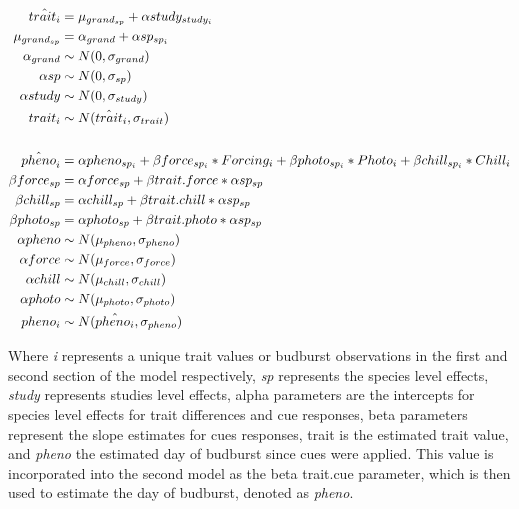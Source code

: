 \documentclass{article}\usepackage[]{graphicx}\usepackage[]{color}
\begin{document}
\begin{align*}
\hat{trait_i} &= \mu_{grand_{sp}} + \alpha study_{study_i} \\
\mu_{grand_{sp}} &= \alpha_{grand} + \alpha sp_{sp_i} \\
\alpha_{grand}  & \sim N(0, \sigma_{grand})\\
\alpha sp & \sim N(0, \sigma_{sp}) \\
\alpha study& \sim N(0, \sigma_{study}) \\
trait_i & \sim N(\hat{trait}_i, \sigma_{trait}) \\
\vspace{1ex}\\
\hat{pheno}_i  &= \alpha pheno_{sp_i} + \beta force_{sp_i} * Forcing_{i} + \beta photo_{sp_i}  * Photo_{i} + \beta chill_{sp_i} * Chill_{i} \\
\beta force_{sp} &= \alpha force_{sp} + \beta trait.force * \alpha sp_{sp}\\
\beta chill_{sp} &= \alpha chill_{sp} + \beta trait.chill * \alpha sp_{sp}\\
\beta photo_{sp} &= \alpha photo_{sp} + \beta trait.photo * \alpha sp_{sp}\\
\alpha pheno & \sim N(\mu_{pheno}, \sigma_{pheno}) \\
\alpha force& \sim N(\mu_{force}, \sigma_{force}) \\
\alpha chill & \sim N(\mu_{chill}, \sigma_{chill}) \\
\alpha photo & \sim N(\mu_{photo}, \sigma_{photo}) \\
pheno_{i} & \sim N(\hat{pheno_i}, \sigma_{pheno}) \\
\end{align*}

Where \emph{i} represents a unique trait values or budburst observations in the first and second section of the model respectively, \emph{sp} represents the species level effects, \emph{study} represents studies level effects, %
alpha parameters are the intercepts for species level effects for trait differences and cue responses, %
 beta parameters represent the slope estimates for cues responses, %
 trait is the estimated trait value, and \emph{pheno} the estimated day of budburst since cues were applied. This value is incorporated into the second model as the %
 beta trait.cue parameter, which is then used to estimate the day of budburst, denoted as \emph{pheno}.
\end{document}
